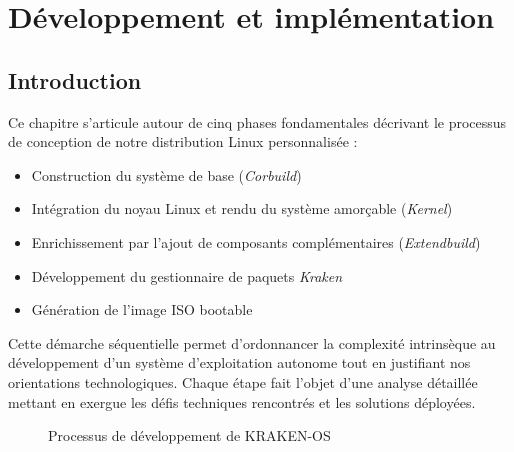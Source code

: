 \chapter{Développement et implémentation}
\clearpage
\setcounter{secnumdepth}{3}

\section{Introduction}
Ce chapitre s'articule autour de cinq phases fondamentales décrivant le processus de conception de notre distribution Linux personnalisée :
\begin{itemize}
    \item Construction du système de base (\textit{Corbuild})
    \item Intégration du noyau Linux et rendu du système amorçable (\textit{Kernel})
    \item Enrichissement par l'ajout de composants complémentaires (\textit{Extendbuild})
    \item Développement du gestionnaire de paquets \textit{Kraken}
    \item Génération de l'image ISO bootable
\end{itemize}

Cette démarche séquentielle permet d'ordonnancer la complexité intrinsèque au développement d'un système d'exploitation autonome tout en justifiant nos orientations technologiques. Chaque étape fait l'objet d'une analyse détaillée mettant en exergue les défis techniques rencontrés et les solutions déployées.

\begin{figure}[htbp]
  \centering
  
  \caption{Processus de développement de KRAKEN-OS}
  \label{fig:dev-process}
\end{figure}


\clearpage



\clearpage




\clearpage





